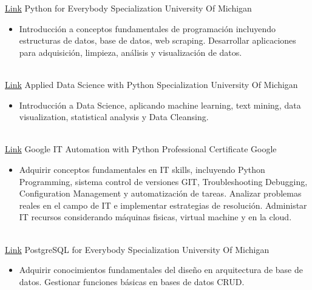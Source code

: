 \documentclass[letterpaper]{DS_class_file} %
\begin{document}
\begin{twenty} %
    \twentyitem
   {\href{https://www.coursera.org/specializations/python?page=7}{Link}}
	{}
	{\hspace{0.3cm}Python for Everybody Specialization}
	{University Of Michigan}
	{}
	{
		{\begin{itemize}
				\item Introducción a conceptos fundamentales de programación incluyendo estructuras de datos, base de datos, web scraping. Desarrollar aplicaciones para adquisición, limpieza, análisis y visualización de datos.
		\end{itemize}}
	}
	\\
	\twentyitem
	{\href{https://www.coursera.org/specializations/data-science-python}{Link}}
	{}
	{\hspace{0.3cm}Applied Data Science with Python Specialization}
	{University Of Michigan}
	{}
	{
		{\begin{itemize}
				\item Introducción a Data Science, aplicando machine learning, text mining, data visualization, statistical analysis  y Data Cleansing. 
		\end{itemize}}
	}
	\\
	\twentyitem
	{\href{https://www.coursera.org/professional-certificates/google-it-automation}{Link}}
	{}
	{\hspace{0.3cm}Google IT Automation with Python Professional Certificate}
	{Google }
	{}
	{
		{\begin{itemize}
				\item Adquirir conceptos fundamentales en IT skills, incluyendo Python Programming, sistema control de versiones GIT, Troubleshooting  Debugging, Configuration Management  y automatización de tareas. Analizar problemas reales en el campo de IT e implementar estrategias de resolución. Administar IT recursos considerando máquinas fisicas, virtual machine y en la cloud.
		\end{itemize}}
	}
	\\
	\twentyitem
	{\href{https://www.coursera.org/specializations/postgresql-for-everybody}{Link}}
	{}
	{\hspace{0.3cm}PostgreSQL for Everybody Specialization}
	{University Of Michigan}
	{}
	{
		{\begin{itemize}
				\item Adquirir conocimientos fundamentales del diseño en arquitectura de base de datos. Gestionar funciones básicas en bases de datos CRUD.
		\end{itemize}}
}
\end{twenty}
\end{document}

